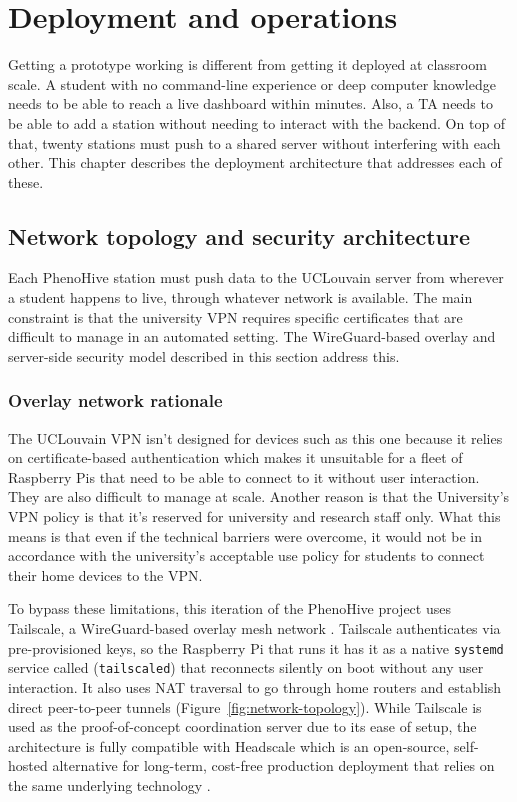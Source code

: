 ﻿\chapter{Deployment and operations}
\label{ch:deployment}

Getting a prototype working is different from getting it deployed at classroom scale. A student with no command-line experience or deep computer knowledge needs to be able to reach a live dashboard within minutes. Also, a TA needs to be able to add a station without needing to interact with the backend. On top of that, twenty stations must push to a shared server without interfering with each other. This chapter describes the deployment architecture that addresses each of these.

\section{Network topology and security architecture}

Each PhenoHive station must push data to the UCLouvain server from wherever a student happens to live, through whatever network is available. The main constraint is that the university VPN requires specific certificates that are difficult to manage in an automated setting. The WireGuard-based overlay and server-side security model described in this section address this.

\subsection{Overlay network rationale}

The UCLouvain VPN \parencite{UCLouvainVPN} isn't designed for devices such as this one because it relies on certificate-based authentication which makes it unsuitable for a fleet of Raspberry Pis that need to be able to connect to it without user interaction. They are also difficult to manage at scale. Another reason is that the University's VPN policy is that it's reserved for university and research staff only. What this means is that even if the technical barriers were overcome, it would not be in accordance with the university's acceptable use policy for students to connect their home devices to the VPN.

To bypass these limitations, this iteration of the PhenoHive project uses Tailscale, a WireGuard-based overlay mesh network \parencite{donenfeld2017wireguard, tailscale}. Tailscale authenticates via pre-provisioned keys, so the Raspberry Pi that runs it has it as a native \texttt{systemd} service called (\texttt{tailscaled}) that reconnects silently on boot without any user interaction. It also uses NAT traversal to go through home routers and establish direct peer-to-peer tunnels (Figure~\ref{fig:network-topology}). While Tailscale is used as the proof-of-concept coordination server due to its ease of setup, the architecture is fully compatible with Headscale which is an open-source, self-hosted alternative for long-term, cost-free production deployment that relies on the same underlying technology \parencite{headscale}.

